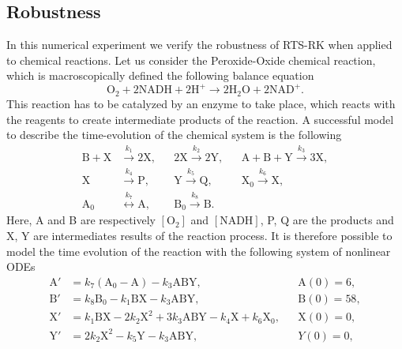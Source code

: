 \documentclass{siamart1116}
\numberwithin{theorem}{section}
\newcommand{\rightarrowtext}[1]{\ensuremath{\stackrel{#1}{\longrightarrow}}}
\newcommand{\leftrightarrowtext}[1]{\ensuremath{\stackrel{#1}{\longleftrightarrow}}}
\begin{document}
\subsection{Robustness} In this numerical experiment we verify the robustness of RTS-RK when applied to chemical reactions. Let us consider the Peroxide-Oxide chemical reaction, which is macroscopically defined the following balance equation
\begin{equation}
	\mathrm{O}_2 + 2\mathrm{NADH} + 2\mathrm{H}^+ \to 2\mathrm{H}_2\mathrm{O} + 2\mathrm{NAD}^+.
\end{equation}
This reaction has to be catalyzed by an enzyme to take place, which reacts with the reagents to create intermediate products of the reaction. A successful model \cite{Ols83} to describe the time-evolution of the chemical system is the following
\begin{equation}
\begin{aligned}
	\mathrm{B} + \mathrm{X} &\rightarrowtext{k_1} 2 \mathrm{X}, 
	&&2\mathrm{X} \rightarrowtext{k_2} 2\mathrm{Y}, 
	&&\mathrm{A} + \mathrm{B} + \mathrm{Y} \rightarrowtext{k_3} 3 \mathrm{X}, \\
	\mathrm{X} &\rightarrowtext{k_4} \mathrm{P}, 
	&&\mathrm{Y} \rightarrowtext{k_5} \mathrm{Q}, 
	&&\mathrm{X_0} \rightarrowtext{k_6} \mathrm{X}, \\
	\mathrm{A_0} &\leftrightarrowtext{k_7} \mathrm{A}, 
	&&\mathrm{B_0} \rightarrowtext{k_8} \mathrm{B}.
\end{aligned}
\end{equation}
Here, A and B are respectively $[\mathrm{O}_2]$ and $[\mathrm{NADH}]$, P, Q are the products and X, Y are intermediates results of the reaction process. It is therefore possible to model the time evolution of the reaction with the following system of nonlinear ODEs 
\begin{equation}\label{eq:PeroxOx}
\begin{aligned}
	\mathrm{A}' &= k_7  (\mathrm{A}_0 - \mathrm{A}) - k_3  \mathrm{A}\mathrm{B}\mathrm{Y}, &&\mathrm{A}(0) = 6, \\
	\mathrm{B}' &= k_8\mathrm{B}_0 - k_1  \mathrm{B}\mathrm{X} - k_3  \mathrm{A}\mathrm{B}\mathrm{Y}, &&\mathrm{B}(0) = 58, \\
	\mathrm{X}' &= k_1  \mathrm{B}\mathrm{X} - 2  k_2  \mathrm{X}^2 + 3  k_3 \mathrm{A}\mathrm{B}\mathrm{Y} - k_4  \mathrm{X} + k_6\mathrm{X}_0,&& \mathrm{X}(0) = 0, \\
	\mathrm{Y}' &= 2  k_2  \mathrm{X}^2 - k_5  \mathrm{Y} - k_3  \mathrm{A}\mathrm{B}\mathrm{Y}, && Y(0) = 0,
\end{aligned}
\end{equation}
\end{document}
